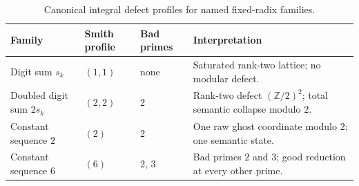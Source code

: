 \begin{table}[htbp]
\centering
\caption{Canonical integral defect profiles for named fixed-radix families.}
\label{tab:block06-defect-profiles}
\small
\begin{tabularx}{\textwidth}{@{}L{0.22\textwidth}L{0.17\textwidth}L{0.18\textwidth}Y@{}}
\toprule
Family & Smith profile & Bad primes & Interpretation\\
\midrule
Digit sum $s_k$ & $(1,1)$ & none & Saturated rank-two lattice; no modular defect.\\
Doubled digit sum $2s_k$ & $(2,2)$ & 2 & Rank-two defect $(\mathbb Z/2)^2$; total semantic collapse modulo $2$.\\
Constant sequence $2$ & $(2)$ & 2 & One raw ghost coordinate modulo $2$; one semantic state.\\
Constant sequence $6$ & $(6)$ & 2, 3 & Bad primes $2$ and $3$; good reduction at every other prime.\\
\bottomrule
\end{tabularx}
\end{table}
